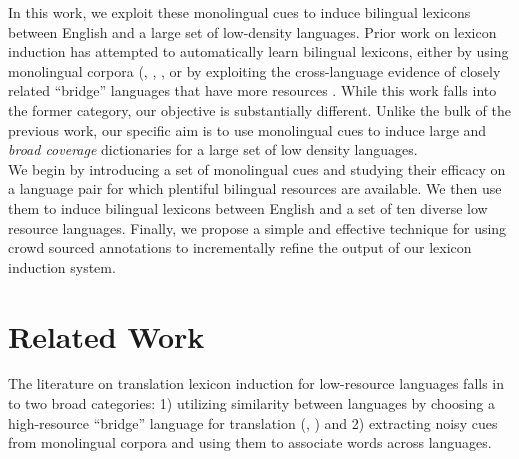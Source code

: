 \documentclass{article}
\begin{document}
In this work, we exploit these monolingual cues to induce bilingual lexicons between English and a large set of low-density languages.  Prior work on lexicon induction has attempted to automatically learn bilingual lexicons, either by using monolingual corpora (\cite{Rapp:1999}, \cite{Koehn:2002}, \cite{Schafer:2002}, \cite{Haghighi:2008} or by exploiting the cross-language evidence of closely related “bridge” languages that have more resources \cite{Mann:2001}.  While this work falls into the former category, our objective is substantially different.  Unlike the bulk of the previous work, our specific aim is to use monolingual cues to induce large and {\em broad coverage} dictionaries for a large set of low density languages.\\

We begin by introducing a set of monolingual cues and studying their efficacy on a language pair for which plentiful bilingual resources are available.  We then use them to induce bilingual lexicons between English and a set of ten diverse low resource languages.  Finally, we propose a simple and effective technique for using crowd sourced annotations to incrementally refine the output of our lexicon induction system.


\section{Related Work} \label{sect:relwork}

The literature on translation lexicon induction for low-resource languages falls in to two broad categories: 1) utilizing similarity between languages by choosing a high-resource “bridge” language for translation (\cite{Mann:2001}, \cite{Schafer:2002}) and 2) extracting noisy cues from monolingual corpora and using them to associate words across languages.\\
\end{document}
